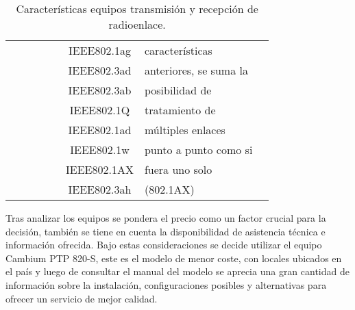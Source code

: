 \begin{table}[H]
\begin{tabular}{|c|c|c|c|c|c|p{10.945em}|c|}
          &       &       &       &       & IEEE802.1ag & características  &  \\
          &       &       &       &       & IEEE802.3ad & anteriores, se suma la &  \\
          &       &       &       &       & IEEE802.3ab &  posibilidad de  &  \\
          &       &       &       &       & IEEE802.1Q & tratamiento de  &  \\
          &       &       &       &       & IEEE802.1ad & múltiples enlaces  &  \\
          &       &       &       &       & IEEE802.1w & punto a punto como si  &  \\
          &       &       &       &       & IEEE802.1AX & fuera uno solo  &  \\
          &       &       &       &       & IEEE802.3ah & (802.1AX) &  \bigstrut[b]\\
    \hline
    \end{tabular}%
    \caption{Características equipos transmisión y recepción de radioenlace.}
  \label{tab:caracteristicas-eq}%
\end{table}%








Tras analizar los equipos se pondera el precio como un factor crucial para la decisión, también se tiene en cuenta la disponibilidad de asistencia técnica e información ofrecida. Bajo estas consideraciones se decide utilizar el equipo Cambium PTP 820-S, este es el modelo de menor coste, con locales ubicados en el país y luego de consultar el manual del modelo se aprecia una gran cantidad de información sobre la instalación, configuraciones posibles y alternativas para ofrecer un servicio de mejor calidad.

\newpage
